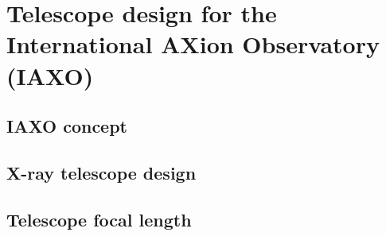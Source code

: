 \chapter{Telescope design for the International AXion Observatory (IAXO)}
\section{IAXO concept}
\section{X-ray telescope design}
\section{Telescope focal length}
